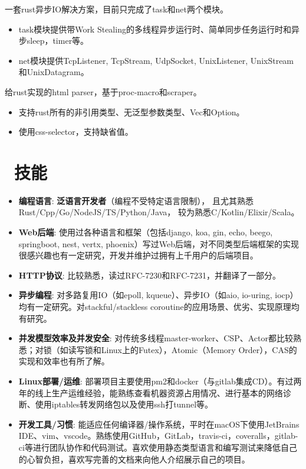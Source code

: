 \documentclass{resume}
\begin{document}
一套rust异步IO解决方案，目前只完成了task和net两个模块。
\begin{itemize}
  \item task模块提供带Work Stealing的多线程异步运行时、简单同步任务运行时和异步sleep，timer等。
  \item net模块提供TcpListener, TcpStream, UdpSocket, UnixListener, UnixStream和UnixDatagram。
\end{itemize}

给rust实现的html parser，基于proc-macro和scraper。
\begin{itemize}
  \item 支持rust所有的非引用类型、无泛型参数类型、Vec和Option。
  \item 使用css-selector，支持缺省值。
\end{itemize}


\section{\texorpdfstring{\faCogs}{}\ 技能}
\begin{itemize}[parsep=0.25ex]
  \item \textbf{编程语言}:
    \textbf{泛语言开发者}（编程不受特定语言限制），
    且尤其熟悉Rust/Cpp/Go/NodeJS/TS/Python/Java，
    较为熟悉C/Kotlin/Elixir/Scala。

  \item \textbf{Web后端}:
    使用过各种语言和框架（包括django, koa, gin, echo, beego, springboot, nest, vertx, phoenix）写过Web后端，对不同类型后端框架的实现很感兴趣也有一定研究，开发并维护过拥有上千用户的后端项目。

  \item \textbf{HTTP协议}:
    比较熟悉，读过RFC-7230和RFC-7231，并翻译了一部分。
  
  \item \textbf{异步编程}:
    对多路复用IO（如epoll, kqueue）、异步IO（如aio, io-uring, iocp）均有一定研究。对stackful/stackless coroutine的应用场景、优劣、实现原理均有研究。

  \item \textbf{并发模型效率及并发安全}:  
    对传统多线程master-worker、CSP、Actor都比较熟悉；对锁（如读写锁和Linux上的Futex），Atomic（Memory Order），CAS的实现和效率也有所了解。

  \item \textbf{Linux部署/运维}:
    部署项目主要使用pm2和docker（与gitlab集成CD）。有过两年的线上生产运维经验，能熟练查看机器资源占用情况、进行基本的网络诊断、使用iptables转发网络包以及使用ssh打tunnel等。

  \item \textbf{开发工具/习惯}:
    能适应任何编译器/操作系统，平时在macOS下使用JetBrains IDE、vim、vscode。熟练使用GitHub，GitLab，travis-ci，coveralls，gitlab-ci等进行团队协作和代码测试。喜欢使用静态类型语言和编写测试来降低自己的心智负担，喜欢写完善的文档来向他人介绍展示自己的项目。
\end{itemize}
\end{document}
